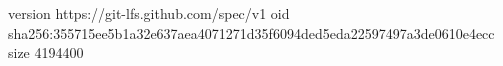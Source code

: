 version https://git-lfs.github.com/spec/v1
oid sha256:355715ee5b1a32e637aea4071271d35f6094ded5eda22597497a3de0610e4ecc
size 4194400
